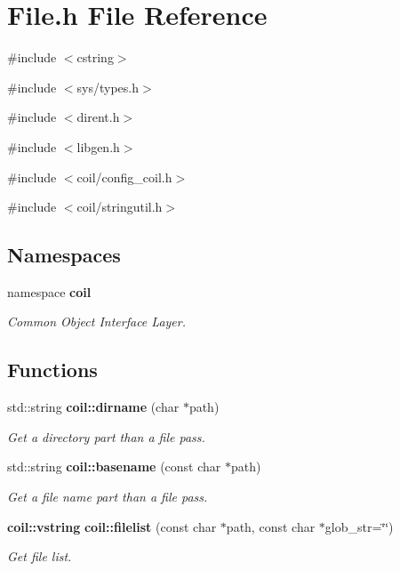 \section{File.h File Reference}
\label{File_8h}
{\ttfamily \#include $<$cstring$>$}\par
{\ttfamily \#include $<$sys/types.h$>$}\par
{\ttfamily \#include $<$dirent.h$>$}\par
{\ttfamily \#include $<$libgen.h$>$}\par
{\ttfamily \#include $<$coil/config\_\-coil.h$>$}\par
{\ttfamily \#include $<$coil/stringutil.h$>$}\par
\subsection*{Namespaces}
\begin{DoxyCompactItemize}
\item 
namespace {\bf coil}


\begin{DoxyCompactList}\small\item\em Common Object Interface Layer. \item\end{DoxyCompactList}

\end{DoxyCompactItemize}
\subsection*{Functions}
\begin{DoxyCompactItemize}
\item 
std::string {\bf coil::dirname} (char $\ast$path)
\begin{DoxyCompactList}\small\item\em Get a directory part than a file pass. \item\end{DoxyCompactList}\item 
std::string {\bf coil::basename} (const char $\ast$path)
\begin{DoxyCompactList}\small\item\em Get a file name part than a file pass. \item\end{DoxyCompactList}\item 
{\bf coil::vstring} {\bf coil::filelist} (const char $\ast$path, const char $\ast$glob\_\-str=\char`\"{}\char`\"{})
\begin{DoxyCompactList}\small\item\em Get file list. \item\end{DoxyCompactList}\end{DoxyCompactItemize}
